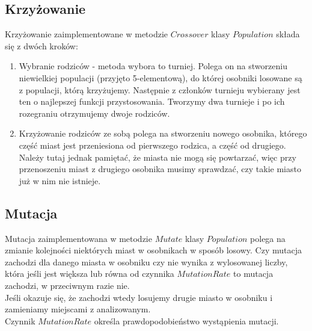 \documentclass[11pt]{article}
\begin{document}
\subsection{Krzyżowanie}
Krzyżowanie zaimplementowane w metodzie $Crossover$ klasy $Population$ składa się z dwóch kroków:
\begin{enumerate}
\item Wybranie rodziców - metoda wybora to turniej. Polega on na stworzeniu niewielkiej populacji (przyjęto 5-elementową), do której osobniki losowane są z populacji, którą krzyżujemy. Następnie z członków turnieju wybierany jest ten o najlepszej funkcji przystosowania. Tworzymy dwa turnieje i po ich rozegraniu otrzymujemy dwoje rodziców.
\item Krzyżowanie rodziców ze sobą polega na stworzeniu nowego osobnika, którego część miast jest przeniesiona od pierwszego rodzica, a część od drugiego. Należy tutaj jednak pamiętać, że miasta nie mogą się powtarzać, więc przy przenoszeniu miast z drugiego osobnika musimy sprawdzać, czy takie miasto już w nim nie istnieje.
\end{enumerate}

\subsection{Mutacja}
Mutacja zaimplementowana w metodzie $Mutate$ klasy $Population$ polega na zmianie kolejności niektórych miast w osobnikach w sposób losowy. Czy mutacja zachodzi dla danego miasta w osobniku czy nie wynika z wylosowanej liczby, która jeśli jest większa lub równa od czynnika $MutationRate$ to mutacja zachodzi, w przeciwnym razie nie.\\
Jeśli okazuje się, że zachodzi wtedy losujemy drugie miasto w osobniku i zamieniamy miejscami z analizowanym.\\
Czynnik $MutationRate$ określa prawdopodobieństwo wystąpienia mutacji.
\end{document}

